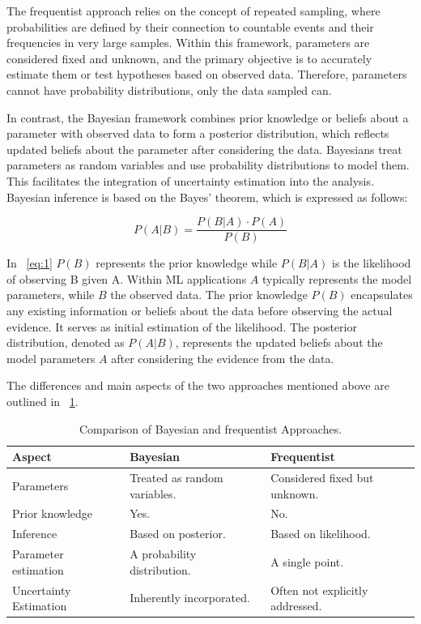 The frequentist approach relies on the concept of repeated sampling, where probabilities are defined by their connection to countable events and their frequencies in very large samples. Within this framework, parameters are considered fixed and unknown, and the primary objective is to accurately estimate them or test hypotheses based on observed data. Therefore, parameters cannot have probability distributions, only the data sampled can.

In contrast, the Bayesian framework combines prior knowledge or beliefs about a parameter with observed data to form a posterior distribution, which reflects updated beliefs about the parameter after considering the data. Bayesians treat parameters as random variables and use probability distributions to model them. This facilitates the integration of uncertainty estimation into the analysis. Bayesian inference is based on the Bayes' theorem, which is expressed as follows:

\begin{equation} \label{eq:1}
	P(A|B) = \frac{P(B|A) \cdot P(A)}{P(B)}
\end{equation}

In \Eq~\ref{eq:1} $P(B)$ represents the prior knowledge while $P(B|A)$ is the likelihood of observing B given A. Within ML applications $A$ typically represents the model parameters, while $B$ the observed data. The prior knowledge $P(B)$ encapsulates any existing information or beliefs about the data before observing the actual evidence. It serves as initial estimation of the likelihood. The posterior distribution, denoted as $P(A|B)$, represents the updated beliefs about the model parameters $A$ after considering the evidence from the data.

The differences and main aspects of the two approaches mentioned above are outlined in \Tab~\ref{table:BayesVsFreq}.

\begin{table}[h]
	\centering
	\begin{tabular}{|| l | l | l ||} 
		\hline
		\textbf{Aspect} & \textbf{Bayesian} & \textbf{Frequentist} \\
		\hline
		\hline
		Parameters & Treated as random variables. & Considered fixed but unknown. \\
		Prior knowledge & Yes. & No. \\
		Inference & Based on posterior. & Based on likelihood. \\
		Parameter estimation & A probability distribution. & A single point. \\	
		Uncertainty Estimation & Inherently incorporated. & Often not explicitly addressed. \\	
		\hline
	\end{tabular}	
	\caption{Comparison of Bayesian and frequentist Approaches.}
	\label{table:BayesVsFreq}
\end{table}

